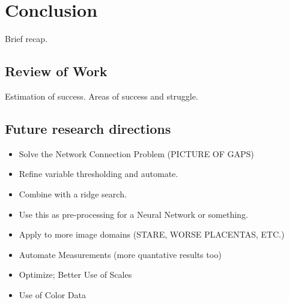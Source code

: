 
\chapter{Conclusion}

Brief recap.

\section{Review of Work}

Estimation of success. Areas of success and struggle.

\section{Future research directions} \label{sec:conclusion.future-research}

\begin{itemize}
	\item Solve the Network Connection Problem (PICTURE OF GAPS)
	\item Refine variable thresholding and automate.
	\item Combine with a ridge search.
	\item Use this as pre-processing for a Neural Network or something.
	\item Apply to more image domains (STARE, WORSE PLACENTAS, ETC.)
	\item Automate Measurements (more quantative results too)
	\item Optimize; Better Use of Scales
	\item Use of Color Data
\end{itemize}
